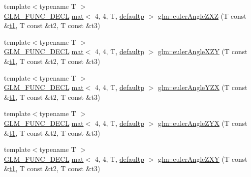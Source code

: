 \begin{DoxyCompactItemize}
\item 
{\footnotesize template$<$typename T $>$ }\\\hyperlink{setup_8hpp_ab2d052de21a70539923e9bcbf6e83a51}{G\+L\+M\+\_\+\+F\+U\+N\+C\+\_\+\+D\+E\+CL} \hyperlink{structglm_1_1mat}{mat}$<$ 4, 4, T, \hyperlink{namespaceglm_a36ed105b07c7746804d7fdc7cc90ff25a9d21ccd8b5a009ec7eb7677befc3bf51}{defaultp} $>$ \hyperlink{group__gtx__euler__angles_ga178f966c52b01e4d65e31ebd007e3247}{glm\+::euler\+Angle\+Z\+XZ} (T const \&\hyperlink{_s_d_l__opengl__glext_8h_af48031a37b713afa3b0d0d7d29653d7c}{t1}, T const \&t2, T const \&t3)
\item 
{\footnotesize template$<$typename T $>$ }\\\hyperlink{setup_8hpp_ab2d052de21a70539923e9bcbf6e83a51}{G\+L\+M\+\_\+\+F\+U\+N\+C\+\_\+\+D\+E\+CL} \hyperlink{structglm_1_1mat}{mat}$<$ 4, 4, T, \hyperlink{namespaceglm_a36ed105b07c7746804d7fdc7cc90ff25a9d21ccd8b5a009ec7eb7677befc3bf51}{defaultp} $>$ \hyperlink{group__gtx__euler__angles_ga996dce12a60d8a674ba6737a535fa910}{glm\+::euler\+Angle\+X\+ZY} (T const \&\hyperlink{_s_d_l__opengl__glext_8h_af48031a37b713afa3b0d0d7d29653d7c}{t1}, T const \&t2, T const \&t3)
\item 
{\footnotesize template$<$typename T $>$ }\\\hyperlink{setup_8hpp_ab2d052de21a70539923e9bcbf6e83a51}{G\+L\+M\+\_\+\+F\+U\+N\+C\+\_\+\+D\+E\+CL} \hyperlink{structglm_1_1mat}{mat}$<$ 4, 4, T, \hyperlink{namespaceglm_a36ed105b07c7746804d7fdc7cc90ff25a9d21ccd8b5a009ec7eb7677befc3bf51}{defaultp} $>$ \hyperlink{group__gtx__euler__angles_ga08bef16357b8f9b3051b3dcaec4b7848}{glm\+::euler\+Angle\+Y\+ZX} (T const \&\hyperlink{_s_d_l__opengl__glext_8h_af48031a37b713afa3b0d0d7d29653d7c}{t1}, T const \&t2, T const \&t3)
\item 
{\footnotesize template$<$typename T $>$ }\\\hyperlink{setup_8hpp_ab2d052de21a70539923e9bcbf6e83a51}{G\+L\+M\+\_\+\+F\+U\+N\+C\+\_\+\+D\+E\+CL} \hyperlink{structglm_1_1mat}{mat}$<$ 4, 4, T, \hyperlink{namespaceglm_a36ed105b07c7746804d7fdc7cc90ff25a9d21ccd8b5a009ec7eb7677befc3bf51}{defaultp} $>$ \hyperlink{group__gtx__euler__angles_ga2e61f1e39069c47530acab9167852dd6}{glm\+::euler\+Angle\+Z\+YX} (T const \&\hyperlink{_s_d_l__opengl__glext_8h_af48031a37b713afa3b0d0d7d29653d7c}{t1}, T const \&t2, T const \&t3)
\item 
{\footnotesize template$<$typename T $>$ }\\\hyperlink{setup_8hpp_ab2d052de21a70539923e9bcbf6e83a51}{G\+L\+M\+\_\+\+F\+U\+N\+C\+\_\+\+D\+E\+CL} \hyperlink{structglm_1_1mat}{mat}$<$ 4, 4, T, \hyperlink{namespaceglm_a36ed105b07c7746804d7fdc7cc90ff25a9d21ccd8b5a009ec7eb7677befc3bf51}{defaultp} $>$ \hyperlink{group__gtx__euler__angles_gab4505c54d2dd654df4569fd1f04c43aa}{glm\+::euler\+Angle\+Z\+XY} (T const \&\hyperlink{_s_d_l__opengl__glext_8h_af48031a37b713afa3b0d0d7d29653d7c}{t1}, T const \&t2, T const \&t3)

\end{DoxyCompactItemize}
